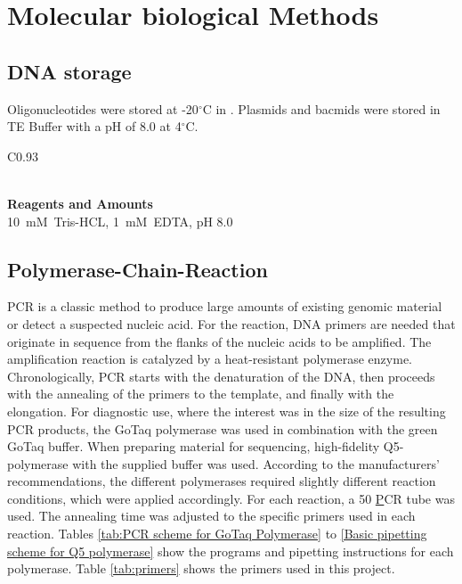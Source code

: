 \section{Molecular biological Methods}

\subsection{DNA storage}

Oligonucleotides were stored at -20\(^\circ\mathrm{C}\) in . Plasmids and bacmids were stored in TE Buffer with a pH of 8.0 at  4\(^\circ\mathrm{C}\). 

\begin{longtable}{C{0.93\linewidth}}
\caption{TE Buffer composition}
\label{TE buffer composition} 
\\
\toprule
{}
\textbf{Reagents and Amounts} \\
\midrule
\endfirsthead
\endfoot
\mbox{10 mM Tris-HCL}, \mbox{1 mM EDTA},  pH 8.0 \\
\bottomrule
\end{longtable}


\subsection{Polymerase-Chain-Reaction}

PCR is a classic method to produce large amounts of existing genomic material or detect a suspected nucleic acid. For the reaction, DNA primers are needed that originate in sequence from the flanks of the nucleic acids to be amplified. The amplification reaction is catalyzed by a heat-resistant polymerase enzyme. Chronologically, PCR starts with the denaturation of the DNA, then proceeds with the annealing of the primers to the template, and finally with the elongation. For diagnostic use, where the interest was in the size of the resulting PCR products, the GoTaq polymerase was used in combination with the green GoTaq buffer. When preparing material for sequencing, high-fidelity Q5-polymerase with the supplied buffer was used. According to the manufacturers' recommendations, the different polymerases required slightly different reaction conditions, which were applied accordingly. For each reaction, a 50 \ul PCR tube was used.  The annealing time was adjusted to the specific primers used in each reaction. Tables \ref{tab:PCR scheme for GoTaq Polymerase} to \ref{Basic pipetting scheme for Q5 polymerase} show the programs and pipetting instructions for each polymerase. Table \ref{tab:primers} shows the primers used in this project.


